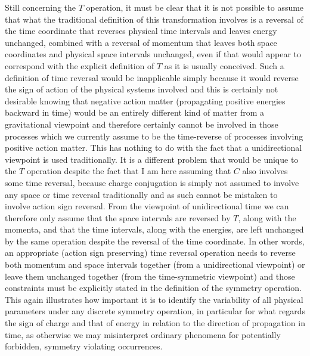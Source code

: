 \documentclass[notitlepage,12pt]{report}
\begin{document}
Still concerning the $T$ operation, it must be clear that it is not possible to assume that what the traditional definition of this transformation involves is a reversal of the time coordinate that reverses physical time intervals and leaves energy unchanged, combined with a reversal of momentum that leaves both space coordinates and physical space intervals unchanged, even if that would appear to correspond with the explicit definition of $T$ as it is usually conceived. Such a definition of time reversal would be inapplicable simply because it would reverse the sign of action of the physical systems involved and this is certainly not desirable knowing that negative action matter (propagating positive energies backward in time) would be an entirely different kind of matter from a gravitational viewpoint and therefore certainly cannot be involved in those processes which we currently assume to be the time-reverse of processes involving positive action matter. This has nothing to do with the fact that a unidirectional viewpoint is used traditionally. It is a different problem that would be unique to the $T$ operation despite the fact that I am here assuming that $C$ also involves some time reversal, because charge conjugation is simply not assumed to involve any space or time reversal traditionally and as such cannot be mistaken to involve action sign reversal. From the viewpoint of unidirectional time we can therefore only assume that the space intervals are reversed by $T$, along with the momenta, and that the time intervals, along with the energies, are left unchanged by the same operation despite the reversal of the time coordinate. In other words, an appropriate (action sign preserving) time reversal operation needs to reverse both momentum and space intervals together (from a unidirectional viewpoint) or leave them unchanged together (from the time-symmetric viewpoint) and those constraints must be explicitly stated in the definition of the symmetry operation. This again illustrates how important it is to identify the variability of all physical parameters under any discrete symmetry operation, in particular for what regards the sign of charge and that of energy in relation to the direction of propagation in time, as otherwise we may misinterpret ordinary phenomena for potentially forbidden, symmetry violating occurrences.
\end{document}
